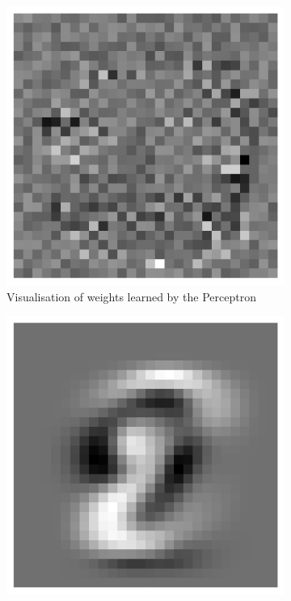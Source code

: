 \documentclass{article}
\begin{document}
\begin{figure}[h!]
    \centering
    \begin{subfigure}[t]{0.3\textwidth}
        \centering
        \includegraphics[width=\textwidth]{./plots/plot6.png}
        \caption{Visualisation of weights learned by the Perceptron}
        \label{fig:plot5a}
    \end{subfigure}
    \hspace{0.01\textwidth}
    \begin{subfigure}[t]{0.3\textwidth}
        \centering
        \includegraphics[width=\textwidth]{./plots/plot7.png}

\end{subfigure}
\end{figure}
\end{document}
